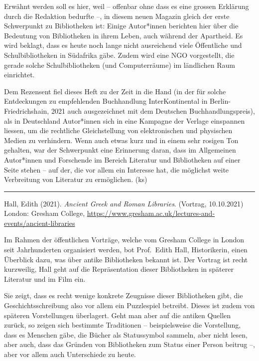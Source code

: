 \documentclass[a4paper,
fontsize=11pt,
oneside,
numbers=noperiodatend,
parskip=half-,
bibliography=totoc,
final
]{scrartcl}
\begin{document}
Erwähnt werden soll es hier, weil -- offenbar ohne dass es eine grossen
Erklärung durch die Redaktion bedurfte --, in diesem neuen Magazin
gleich der erste Schwerpunkt zu Bibliotheken ist: Einige Autor*innen
berichten hier über die Bedeutung von Bibliotheken in ihrem Leben, auch
während der Apartheid. Es wird beklagt, dass es heute noch lange nicht
ausreichend viele Öffentliche und Schulbibliotheken in Südafrika gäbe.
Zudem wird eine NGO vorgestellt, die gerade solche Schulbibliotheken
(und Computerräume) im ländlichen Raum einrichtet.

Dem Rezensent fiel dieses Heft zu der Zeit in die Hand (in der für
solche Entdeckungen zu empfehlenden Buchhandlung InterKontinental in
Berlin-Friedrichshain, 2021 auch ausgezeichnet mit dem Deutschen
Buchhandlungspreis), als in Deutschland Autor*innen sich in eine
Kampagne der Verlage einspannen liessen, um die rechtliche
Gleichstellung von elektronischen und physischen Medien zu verhindern.
Wenn auch etwas kurz und in einem sehr rosigen Ton gehalten, war der
Schwerpunkt eine Erinnerung daran, dass im Allgemeinen Autor*innen und
Forschende im Bereich Literatur und Bibliotheken auf einer Seite stehen
-- auf der, die vor allem ein Interesse hat, die möglichst weite
Verbreitung von Literatur zu ermöglichen. (ks)

\begin{center}\rule{0.5\linewidth}{0.5pt}\end{center}

Hall, Edith (2021). \emph{Ancient Greek and Roman Libraries}. (Vortrag,
10.10.2021) London: Gresham College,
\url{https://www.gresham.ac.uk/lectures-and-events/ancient-libraries}

Im Rahmen der öffentlichen Vorträge, welche vom Gresham College in
London seit Jahrhunderten organisiert werden, bot Prof.~Edith Hall,
Historikerin, einen Überblick dazu, was über antike Bibliotheken bekannt
ist. Der Vortrag ist recht kurzweilig, Hall geht auf die Repräsentation
dieser Bibliotheken in späterer Literatur und im Film ein.

Sie zeigt, dass es recht wenige konkrete Zeugnisse dieser Bibliotheken
gibt, die Geschichtsschreibung also vor allem ein Puzzlespiel betreibt.
Dieses ist zudem von späteren Vorstellungen überlagert. Geht man aber
auf die antiken Quellen zurück, so zeigen sich bestimmte Traditionen --
beispielsweise die Vorstellung, dass es Menschen gäbe, die Bücher als
Statussymbol sammeln, aber nicht lesen, aber auch, dass das Gründen von
Bibliotheken zum Status einer Person beitrug --, aber vor allem auch
Unterschiede zu heute.
\end{document}
